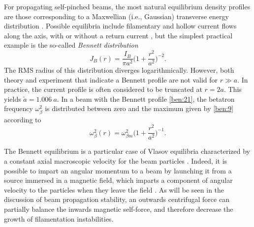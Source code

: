 \documentclass [12pt,a4paper,     ]{report} %
\begin{document}
	For propagating self-pinched beams, the most natural equilibrium density profiles are those corresponding to a Maxwellian (i.e., Gaussian) transverse energy distribution \cite{BENFO1971-}.  Possible equilibria include filamentary and hollow current flows along the axis, with or without a return current \cite{IVANO1970-,BENFO1970-,KUPPE1973B,GRIGO1978-,HUBBA1988-}, but the simplest practical example is the so-called \emph{Bennett distribution} \cite{BENNE1934-,BENNE1955-}
%
\begin{equation}\label{ben:21} %
     J_B(r) = \frac{I_B}{\pi a^2} \bigr(1 + \frac{r^2}{a^2}\bigl)^{-2}.
\end{equation}
%
The RMS radius of this distribution diverges logarithmically.  However, both theory and experiment \cite{LEE--1976B,BRIGG1976-} that indicate a Bennett profile are not valid for $r \gg a$.  In practice, the current profile is often considered to be truncated at $r=2a$.  This yields $\tilde{a}= 1.006~a$.  In a beam with the Bennett profile \eqref{ben:21}, the betatron frequency $\omega_\beta^2$ is distributed between zero and the maximum given by \eqref{ben:9} according to
%
\begin{equation}\label{ben:22} %
 \omega_\beta^2(r) = \omega_{\beta m}^2 \bigr(1 + \frac{r^2}{a^2}\bigl)^{-1}.
\end{equation}
%

   The Bennett equilibrium is a particular case of Vlasov equilibria characterized by a constant axial macroscopic velocity for the beam particles \cite{DAVID1974-, GRATR1978-,DAVID1979-}.  Indeed, it is possible to impart an angular momentum to a beam by launching it from a source immersed in a magnetic field, which imparts  a component of angular velocity to the particles when they leave the field \cite[p.138]{LAWSO1977-}.   As will be seen in the discussion of beam propagation stability, an outwards centrifugal force can partially balance the inwards magnetic self-force, and therefore decrease the growth of filamentation instabilities.
\end{document}
